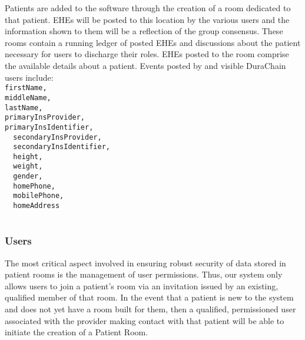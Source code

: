 \documentclass[letterpaper]{article}
\begin{document}
  Patients are added to the software through the creation of a room dedicated to that patient. EHEs will be posted to this location by the various users and the information shown to them will be a reflection of the group consensus. These rooms contain a running ledger of posted EHEs and discussions about the patient necessary for users to discharge their roles.
%
  EHEs posted to the room comprise the available details about a patient. Events posted by and visible DuraChain users include:
%
  \texttt{
  {\\
  firstName,\\
  middleName,\\
  lastName,\\
  primaryInsProvider,\\
  primaryInsIdentifier,\\ 
  secondaryInsProvider,\\ 
  secondaryInsIdentifier,\\ 
  height,\\ 
  weight,\\ 
  gender,\\ 
  homePhone,\\ 
  mobilePhone,\\ 
  homeAddress\\
  }
  }
%
  \subsubsection{Users}
  The most critical aspect involved in ensuring robust security of data stored in patient rooms is the management of user permissions. Thus, our system only allows users to join a patient's room via an invitation issued by an existing, qualified member of that room. In the event that a patient is new to the system and does not yet have a room built for them, then a qualified, permissioned user associated with the provider making contact with that patient will be able to initiate the creation of a Patient Room.
%
\end{document}
